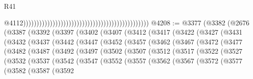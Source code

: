 \begin{lexlean}{R41}
\begin{coremodule}
                                                                                                  @4112)))))))))))))))))))))))))))))))))))))))))))))))
@4208 := @3377
    (@3382
      (@2676
        (@3387
          (@3392
            (@3397
              (@3402
                (@3407
                  (@3412
                    (@3417
                      (@3422
                        (@3427
                          (@3431
                            (@3432
                              (@3437
                                (@3442
                                  (@3447
                                    (@3452
                                      (@3457
                                        (@3462
                                          (@3467
                                            (@3472
                                              (@3477
                                                (@3482
                                                  (@3487
                                                    (@3492
                                                      (@3497
                                                        (@3502
                                                          (@3507
                                                            (@3512
                                                              (@3517
                                                                (@3522
                                                                  (@3527
                                                                    (@3532
                                                                      (@3537
                                                                        (@3542
                                                                          (@3547
                                                                            (@3552
                                                                              (@3557
                                                                                (@3562
                                                                                  (@3567
                                                                                    (@3572
                                                                                      (@3577
                                                                                        (@3582
                                                                                          (@3587
                                                                                            (@3592

\end{coremodule}
\end{lexlean}
